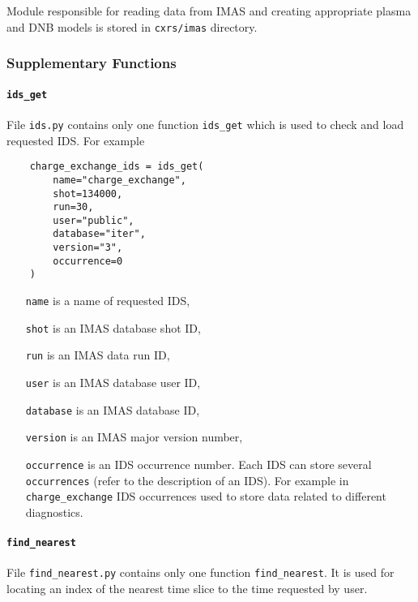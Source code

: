 \documentclass[../../main.tex]{subfiles}
\begin{document}
Module responsible for reading data from IMAS and creating appropriate plasma and DNB models is stored in \texttt{cxrs\//imas} directory.

\subsubsection{Supplementary Functions}%
\label{sec:imas_supp}

\paragraph{\texttt{ids\_get}}%

File \texttt{ids.py} contains only one function \texttt{ids\_get} which is used to check and load requested IDS. For example

\begin{verbatim}
    charge_exchange_ids = ids_get(
        name="charge_exchange",
        shot=134000,
        run=30,
        user="public",
        database="iter",
        version="3",
        occurrence=0
    )
\end{verbatim}

\begin{itemize}[align=left]
    \item[\texttt{name}] is a name of requested IDS,
    \item[\texttt{shot}] is an IMAS database shot ID,
    \item[\texttt{run}] is an IMAS data run ID,
    \item[\texttt{user}] is an IMAS database user ID,
    \item[\texttt{database}] is an IMAS database ID,
    \item[\texttt{version}] is an IMAS major version number,
    \item[\texttt{occurrence}] is an IDS occurrence number. Each IDS can store several \texttt{occurrences} (refer to the description of an IDS). For example in \texttt{charge\_exchange} IDS occurrences used to store data related to different diagnostics.
\end{itemize}

\paragraph{\texttt{find\_nearest}}%

File \texttt{find\_nearest.py} contains only one function \texttt{find\_nearest}. It is used for locating an index of the nearest time slice to the time requested by user.
\end{document}
